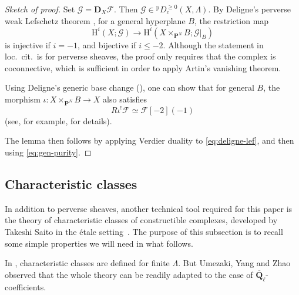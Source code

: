 \documentclass[english]{smfart}
\renewcommand{\mathbb}{\mathbf}
\renewcommand{\leq}{\leqslant}
\renewcommand{\geq}{\geqslant}
\theoremstyle{remark}
\theoremstyle{plain}
\theoremstyle{definition}
\numberwithin{equation}{remark}
\theoremstyle{void}
\begin{document}
\begin{proof}[Sketch of proof]
Set \(\mathcal{G} = \mathbf{D}_{X}\mathcal{F}\).  Then
\(\mathcal{G} \in {}^{\mathrm{p}}D^{\geq0}_c(X,\Lambda)\).
By Deligne's perverse weak Lefschetz theorem
\cite[Corollary~A.5]{katz_affine-cohomological-transforms}, for a
general hyperplane \(B\), the restriction map
\begin{equation}
\label{eq:deligne-lef}
\mathrm{H}^i(X;\mathcal{G}) \to
\mathrm{H}^i(X\times_{\mathbf{P}^N}B;\mathcal{G}|_{B})
\end{equation}
is injective if \(i = -1\), and bijective if \(i \leq -2\).  Although
the statement in loc.~cit.\ is for perverse sheaves, the proof only
requires that the complex is coconnective, which is sufficient in
order to apply Artin's vanishing theorem.

Using Deligne's generic base change
(\cite[Corollarie~2.9]{deligne_finitude}), one can show that for
general \(B\), the morphism
\(\iota\colon X \times_{\mathbf{P}^N} B \to X\) also satisfies
\begin{equation}
\label{eq:gen-purity}
R\iota^{!}\mathcal{F} \simeq \mathcal{F}[-2](-1)
\end{equation}
(see, for example, \cite[Lemma~3.2]{wan-zhang_colevel} for details).

The lemma then follows by applying Verdier duality to
\eqref{eq:deligne-lef}, and then using \eqref{eq:gen-purity}.
\end{proof}

\subsection{Characteristic classes}

In addition to perverse sheaves, another technical tool required
for this paper is the theory of characteristic classes of constructible
complexes, developed by Takeshi Saito in the étale
setting~\cite{saito_takeshi_characteristic-cycle-and-singular-support}.
The purpose of this subsection is to recall some simple properties we will
need in what follows.

In \cite{saito_takeshi_characteristic-cycle-and-singular-support},
characteristic classes are defined for finite \(\Lambda\).  But
Umezaki, Yang and Zhao \cite[\S5.3]{umezaki-yang-zhao} observed that the
whole theory can be readily adapted to the case of
\(\overline{\mathbb{Q}}_{\ell}\)-coefficients.
\end{document}
